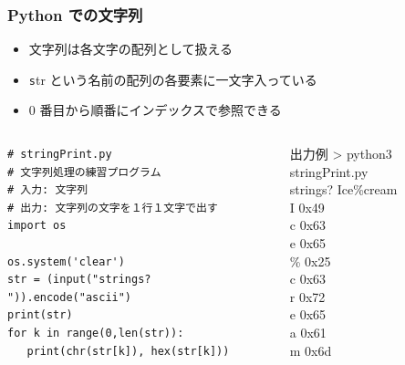 \begin{frame}
\frametitle{Python での文字列}
  \begin{itemize}
\item 文字列は各文字の配列として扱える
\item {\texttt str} という名前の配列の各要素に一文字入っている
\item 0 番目から順番にインデックスで参照できる
  \end{itemize}
  \begin{columns}
    \begin{column}{0.55\textwidth}
      \begin{lstlisting}[caption={stringPrint.py},label=lst:strprt]
# stringPrint.py
# 文字列処理の練習プログラム
# 入力: 文字列
# 出力: 文字列の文字を１行１文字で出す
import os

os.system('clear')
str = (input("strings? ")).encode("ascii")
print(str)
for k in range(0,len(str)):
   print(chr(str[k]), hex(str[k]))
      \end{lstlisting}
    \end{column}
    \begin{column}{0.35\textwidth}
      \begin{itembox}{出力例}
\scriptsize
> python3 stringPrint.py\\
strings? Ice\%cream\\
I 0x49\\
c 0x63\\
e 0x65\\
\% 0x25\\
c 0x63\\
r 0x72\\
e 0x65\\
a 0x61\\
m 0x6d
      \end{itembox}
    \end{column}
  \end{columns}
\end{frame}
